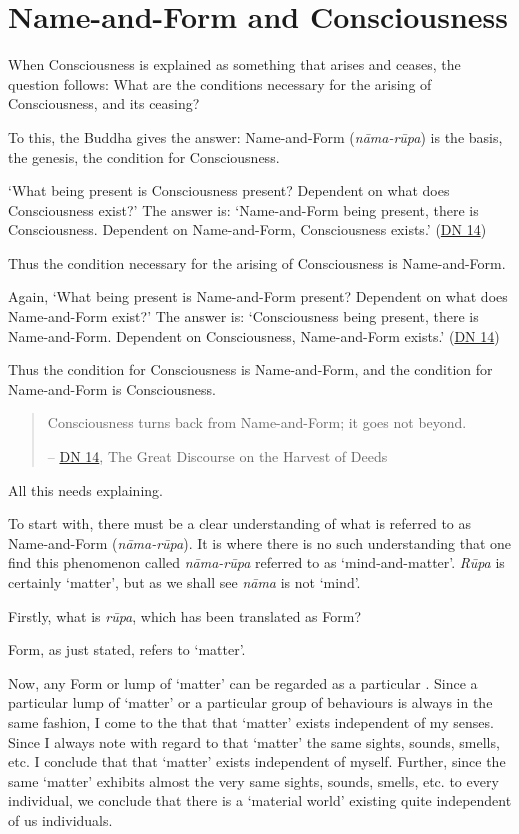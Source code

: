 \chapter{Name-and-Form and Consciousness}

When Consciousness is explained as something that arises and ceases, the question follows: What are the conditions necessary for the arising of Consciousness, and its ceasing?

To this, the Buddha gives the answer: Name-and-Form (\emph{nāma-rūpa}) is the basis, the genesis, the condition for Consciousness.

`What being present is Consciousness present? Dependent on what does Consciousness exist?' The answer is: `Name-and-Form being present, there is Consciousness. Dependent on Name-and-Form, Consciousness exists.' (\href{https://suttacentral.net/dn14/en/sujato}{DN 14})

Thus the condition necessary for the arising of Consciousness is Name-and-Form.

Again, `What being present is Name-and-Form present? Dependent on what does Name-and-Form exist?' The answer is: `Consciousness being present, there is Name-and-Form. Dependent on Consciousness, Name-and-Form exists.' (\href{https://suttacentral.net/dn14/en/sujato}{DN 14})

Thus the condition for Consciousness is Name-and-Form, and the condition for Name-and-Form is Consciousness.

\begin{quote}
Consciousness turns back from Name-and-Form; it goes not beyond.

 -- \href{https://suttacentral.net/dn14/en/sujato}{DN 14}, The Great Discourse on the Harvest of Deeds
\end{quote}

All this needs explaining.

To start with, there must be a clear understanding of what is referred to as Name-and-Form (\emph{nāma-rūpa}). It is where there is no such understanding that one find this phenomenon called \emph{nāma-rūpa} referred to as `mind-and-matter'. \emph{Rūpa} is certainly `matter', but as we shall see \emph{nāma} is not `mind'.

Firstly, what is \emph{rūpa}, which has been translated as Form?

Form, as just stated, refers to `matter'.

Now, any Form or lump of `matter' can be regarded as a particular . Since a particular lump of `matter' or a particular group of behaviours is always  in the same fashion, I come to the  that that `matter' exists independent of my senses. Since I always note with regard to that `matter' the same sights, sounds, smells, etc. I conclude that that `matter' exists independent of myself. Further, since the same `matter' exhibits almost the very same sights, sounds, smells, etc. to every individual, we conclude that there is a `material world' existing quite independent of us individuals.

